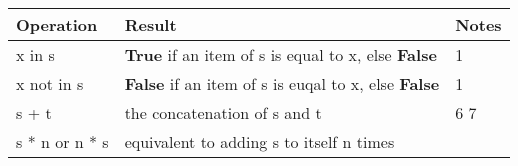\documentclass[11pt]{article}
\begin{document}
\begin{longtable}[]{@{}lll@{}}
\toprule
\begin{minipage}[b]{0.14\columnwidth}\raggedright\strut
Operation\strut
\end{minipage} & \begin{minipage}[b]{0.14\columnwidth}\raggedright\strut
Result\strut
\end{minipage} & \begin{minipage}[b]{0.14\columnwidth}\raggedright\strut
Notes\strut
\end{minipage}\tabularnewline
\midrule
\endhead
\begin{minipage}[t]{0.14\columnwidth}\raggedright\strut
x in s\strut
\end{minipage} & \begin{minipage}[t]{0.14\columnwidth}\raggedright\strut
\textbf{True} if an item of s is equal to x, else \textbf{False}\strut
\end{minipage} & \begin{minipage}[t]{0.14\columnwidth}\raggedright\strut
1\strut
\end{minipage}\tabularnewline
\begin{minipage}[t]{0.14\columnwidth}\raggedright\strut
x not in s\strut
\end{minipage} & \begin{minipage}[t]{0.14\columnwidth}\raggedright\strut
\textbf{False} if an item of s is euqal to x, else \textbf{False}\strut
\end{minipage} & \begin{minipage}[t]{0.14\columnwidth}\raggedright\strut
1\strut
\end{minipage}\tabularnewline
\begin{minipage}[t]{0.14\columnwidth}\raggedright\strut
s + t\strut
\end{minipage} & \begin{minipage}[t]{0.14\columnwidth}\raggedright\strut
the concatenation of s and t\strut
\end{minipage} & \begin{minipage}[t]{0.14\columnwidth}\raggedright\strut
6 7\strut
\end{minipage}\tabularnewline
\begin{minipage}[t]{0.14\columnwidth}\raggedright\strut
s * n or n * s\strut
\end{minipage} & \begin{minipage}[t]{0.14\columnwidth}\raggedright\strut
equivalent to adding s to itself n times\strut
\end{minipage} & \begin{minipage}[t]{0.14\columnwidth}\raggedright\strut

\end{minipage}
\end{longtable}
\end{document}
